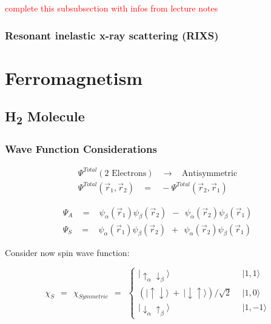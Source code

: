 \documentclass[10pt]{report}
\numberwithin{equation}{chapter}
\begin{document}
\textcolor{red}{complete this subsubsection with infos from lecture notes}


\subsubsection{Resonant inelastic x-ray scattering (RIXS)}



\section{Ferromagnetism}

\subsection{H\textsubscript{2} Molecule}

\subsubsection{Wave Function Considerations}

\begin{align}
  \Psi^{Total}(\text{2 Electrons})   ~~~~ \rightarrow ~~~~ \text{Antisymmetric}\\
  \Psi^{Total}(\vec{r}_1, \vec{r}_2) ~~~~ = ~~~~ - \Psi^{Total}(\vec{r}_2, \vec{r}_1)
\end{align}


\begin{align}
  \Psi_A ~~~~ = ~~~~ \psi_\alpha(\vec{r}_1) \psi_\beta(\vec{r}_2) ~~ - ~~ \psi_\alpha(\vec{r}_2)\psi_\beta(\vec{r}_1)\\
  \Psi_S ~~~~ = ~~~~ \psi_\alpha(\vec{r}_1) \psi_\beta(\vec{r}_2) ~~ + ~~ \psi_\alpha(\vec{r}_2)\psi_\beta(\vec{r}_1)
\end{align}



Consider now spin wave function:

\begin{equation}
  \chi_S ~~ = ~~ \chi_{Symmetric} ~~ = ~~ \left\{ 
  \begin{array}{ll}
    | \uparrow_\alpha \downarrow_\beta \rangle &~~ | 1,1 \rangle\\
    \left( | \uparrow \downarrow \rangle ~+~ | \downarrow \uparrow \rangle \right)/ \sqrt{2} &~~ | 1,0 \rangle\\
    | \downarrow_\alpha \uparrow_\beta \rangle &~~ | 1,-1 \rangle
  \end{array}\right.
\end{equation}
\end{document}
